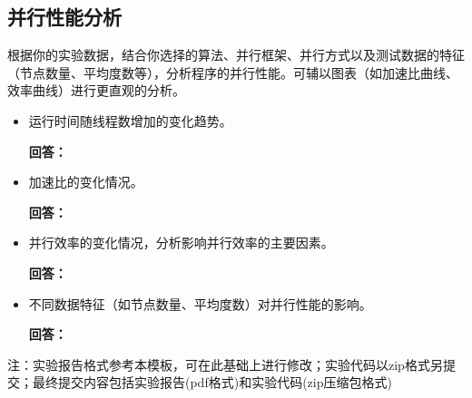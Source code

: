 \documentclass{SYSUReport}
\begin{document}
\subsection{并行性能分析}
根据你的实验数据，结合你选择的算法、并行框架、并行方式以及测试数据的特征（节点数量、平均度数等），分析程序的并行性能。可辅以图表（如加速比曲线、效率曲线）进行更直观的分析。
\begin{itemize}
    \item 运行时间随线程数增加的变化趋势。

    \textbf{回答：}
    \item 加速比的变化情况。

        \textbf{回答：}

    \item 并行效率的变化情况，分析影响并行效率的主要因素。

        \textbf{回答：}

    \item 不同数据特征（如节点数量、平均度数）对并行性能的影响。

        \textbf{回答：}

\end{itemize}

注：实验报告格式参考本模板，可在此基础上进行修改；实验代码以zip格式另提交；最终提交内容包括实验报告(pdf格式)和实验代码(zip压缩包格式)
\end{document}
